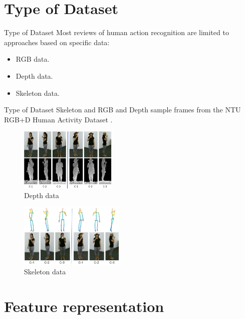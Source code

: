 \section{Type of Dataset}
\begin{frame}{Type of Dataset}
    Most reviews of human action recognition are limited to approaches based on specific data:

    \begin{itemize}
        \item RGB data.
        \item Depth data.
        \item Skeleton data.
    \end{itemize}
\end{frame}

\begin{frame}{Type of Dataset}
    Skeleton and RGB and Depth sample frames from the NTU RGB+D Human Activity Dataset \cite{shahroudy2016ntu}.
    \begin{multicols}{2}
        \begin{figure}[htp]
            \centering
            \includegraphics[height=3cm]{images/v1survey/depth_data_ex.png}
            \caption{Depth data}
            \label{fig:depth_data_ex}
        \end{figure}
        \begin{figure}[htp]
            \centering
            \includegraphics[height=3cm]{images/v1survey/skeleton_data_ex.png}
            \caption{Skeleton data}
            \label{fig:skeleton_data_ex}
        \end{figure}
    \end{multicols}
\end{frame}

\section{Feature representation}
